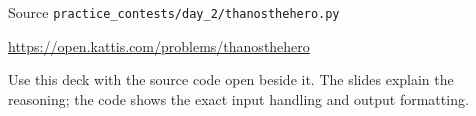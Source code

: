 \documentclass[aspectratio=169,11pt]{beamer}
\begin{document}
\begin{frame}{Source}
\small
{} \texttt{practice\_contests/day\_2/thanosthehero.py}

\vspace{0.3cm}
 \url{https://open.kattis.com/problems/thanosthehero}

\vspace{0.45cm}
Use this deck with the source code open beside it. The slides explain the reasoning; the code shows the exact input handling and output formatting.
\end{frame}
\end{document}
